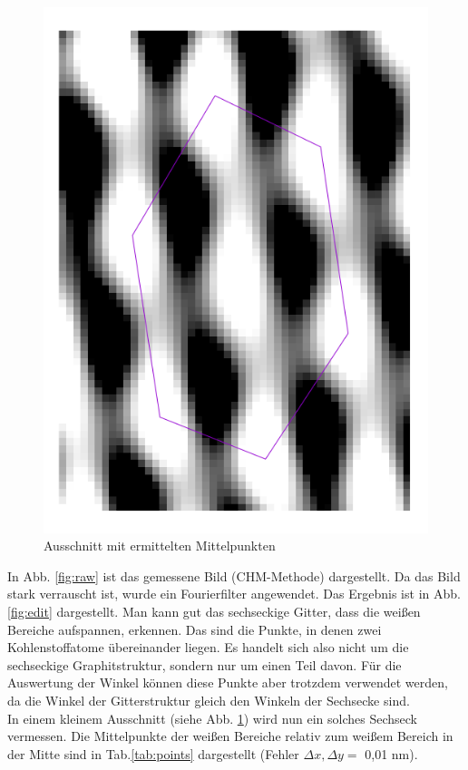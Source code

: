 \begin{figure}
\centering
\includegraphics[scale=0.35]{data/graphit/graphit.png}
\caption{Ausschnitt mit ermittelten Mittelpunkten}
\label{fig:small}
\end{figure}
In Abb. \ref{fig:raw} ist das gemessene Bild (CHM-Methode) dargestellt. Da das Bild stark verrauscht ist, wurde ein Fourierfilter angewendet. Das Ergebnis ist in Abb. \ref{fig:edit} dargestellt. Man kann gut das sechseckige Gitter, dass die weißen Bereiche aufspannen, erkennen. Das sind die Punkte, in denen zwei Kohlenstoffatome übereinander liegen. Es handelt sich also nicht um die sechseckige Graphitstruktur, sondern nur um einen Teil davon. Für die Auswertung der Winkel können diese Punkte aber trotzdem verwendet werden, da die Winkel der Gitterstruktur gleich den Winkeln der Sechsecke sind.\\

In einem kleinem Ausschnitt (siehe Abb. \ref{fig:small}) wird nun ein solches Sechseck vermessen. Die Mittelpunkte der weißen Bereiche relativ zum weißem Bereich in der Mitte sind in Tab.\ref{tab:points} dargestellt (Fehler $\Delta x,\Delta y=$ 0,01 nm).

